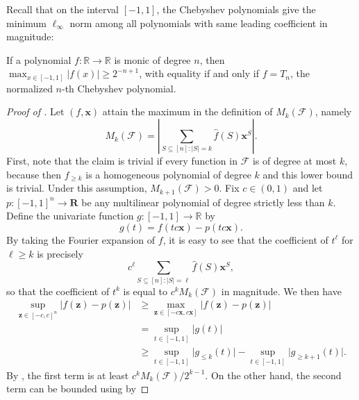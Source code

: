 Recall that on the interval $[-1,1]$, the Chebyshev polynomials give the minimum $\ell_{\infty}$ norm among all polynomials with same leading coefficient in magnitude:

\begin{fact}
\label{fact:cheb3}
If a polynomial $f:\mathbb{R}\to \mathbb{R}$ is monic of degree $n$, then $\max_{x\in [-1,1]} \vert f(x)\vert\geq 2^{-n+1}$, with equality if and only if $f=T_n$, the normalized $n$-th Chebyshev polynomial.
\end{fact}

\begin{proof}[Proof of ]
Let $(f,\mathbf{x})$ attain the maximum in the definition of $M_k(\mathcal{F})$, namely
\begin{equation*}
    M_k(\mathcal{F}) = \left\vert \sum_{S\subseteq [n]:\vert S\vert=k} \widehat{f}(S)\mathbf{x}^S\right\vert.
\end{equation*}
First, note that the claim is trivial if every function in $\mathcal{F}$ is of degree at most $k$, because then $f_{\geq k}$ is a homogeneous polynomial of degree $k$ and this lower bound is trivial. Under this assumption, $M_{k+1}(\mathcal{F})>0$. Fix $c\in (0,1)$ and let $p:[-1,1]^n\to \mathbf{R}$ be any multilinear polynomial of degree strictly less than $k$. Define the univariate function $g:[-1,1]\to \mathbb{R}$ by
\begin{equation*}
    g(t) = f(tc\mathbf{x})- p(tc\mathbf{x}).
\end{equation*}
By taking the Fourier expansion of $f$, it is easy to see that the coefficient of $t^{\ell}$ for $\ell\geq k$ is precisely
\begin{equation*}
    c^{\ell}\sum_{S\subseteq [n]:\vert S\vert=\ell} \widehat{f}(S)\mathbf{x}^S,
\end{equation*}
so that the coefficient of $t^k$ is equal to $c^k M_k(\mathcal{F})$ in magnitude.
We then have
\begin{align*}
    \sup_{\mathbf{z}\in [-c,c]^n} \vert f(\mathbf{z})-p(\mathbf{z})\vert&\geq \max_{\mathbf{z}\in [-c\mathbf{x},c\mathbf{x}]} \vert f(\mathbf{z})-p(\mathbf{z})\vert\\
    &=\sup_{t\in [-1,1]} \vert g(t)\vert\\
    &\geq \sup_{t\in [-1,1]} \vert g_{\leq k}(t)\vert - \sup_{t\in [-1,1]} \vert g_{\geq k+1}(t)\vert.
\end{align*}
By , the first term is at least $c^kM_k(\mathcal{F})/2^{k-1}$. On the other hand, the second term can be bounded using  by

\end{proof}

